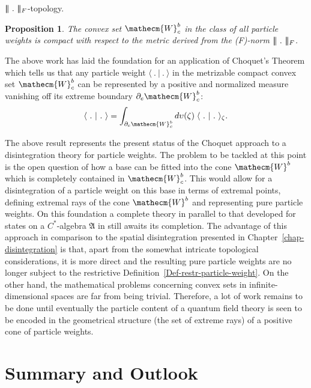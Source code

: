 \documentclass[11pt,twoside,openright]{report}
\theoremstyle{definition}
\theoremstyle{plain}
\newtheorem{Pro}[Def]{Proposition}
\theoremstyle{remark}
\theoremstyle{assumption}
\newcommand{\FNorm}[1]{\lvert \negthinspace \lvert \negthinspace \lvert
  #1 \rvert \negthinspace \rvert \negthinspace \rvert_F}
\newcommand{\scp}[2]{\langle #1 \vert #2 \rangle}
\newcommand{\Wecm}{\mathecm{W}}
\newcommand{\Afrak}{\mathfrak{A}}
\begin{document}
$\FNorm{~.~}$-topology.
\begin{Pro}
  The convex set $\Wecm_c^b$ in the class of all particle weights is
  compact with respect to the metric derived from the (F)-norm
  $\FNorm{~.~}$.
\end{Pro}
The above work has laid the foundation for an application of Choquet's
Theorem \cite[Corollary~I.4.9]{alfsen:1971} which tells us that any
particle weight $\scp{~.~}{~.~}$ in the metrizable compact convex set
$\Wecm_c^b$ can be represented by a positive and normalized measure
vanishing off its extreme boundary $\partial_e \Wecm_c^b$:
\begin{equation}
  \label{eq-choquet-prep-integral}
    \scp{~.~}{~.~} = \int_{\partial_e \Wecm_c^b} d \upsilon ( \zeta ) \;
    \scp{~.~}{~.~}_\zeta \text{.}
\end{equation}

The above result represents the present status of the Choquet approach
to a disintegration theory for particle weights. The problem to be
tackled at this point is the open question of how a base can be fitted
into the cone $\Wecm^b$ which is completely contained in $\Wecm_c^b$.
This would allow for a disintegration of a particle weight on this
base in terms of extremal points, defining extremal rays of the cone
$\Wecm^b$ and representing pure particle weights. On this foundation a
complete theory in parallel to that developed for states on a
$C^*$-algebra $\Afrak$ in \cite[Sections~4.1 and
4.2]{bratteli/robinson:1987} still awaits its completion. The
advantage of this approach in comparison to the spatial disintegration
presented in Chapter~\ref{chap-disintegration} is that, apart from the
somewhat intricate topological considerations, it is more direct and
the resulting pure particle weights are no longer subject to the
restrictive Definition~\ref{Def-restr-particle-weight}. On the other
hand, the mathematical problems concerning convex sets in
infinite-dimensional spaces are far from being trivial. Therefore, a
lot of work remains to be done until eventually the particle content
of a quantum field theory is seen to be encoded in the geometrical
structure (the set of extreme rays) of a positive cone of particle
weights.


\chapter{Summary and Outlook}
  \label{chap-summary}
\end{document}
